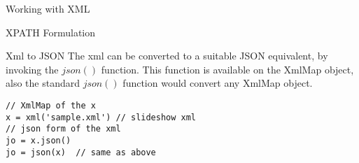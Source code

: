\begin{section}{Working with XML}
\begin{subsection}{XPATH Formulation}
\end{subsection}

\begin{subsection}{Xml to JSON}
The xml can be converted to a suitable JSON equivalent, by invoking the $json()$ function.
This function is available on the XmlMap object, also the standard $json()$ function 
would convert any XmlMap object.

\begin{lstlisting}[style=JexlStyle]
// XmlMap of the x 
x = xml('sample.xml') // slideshow xml
// json form of the xml 
jo = x.json() 
jo = json(x)  // same as above
\end{lstlisting}
 
\end{subsection}

\end{section}

